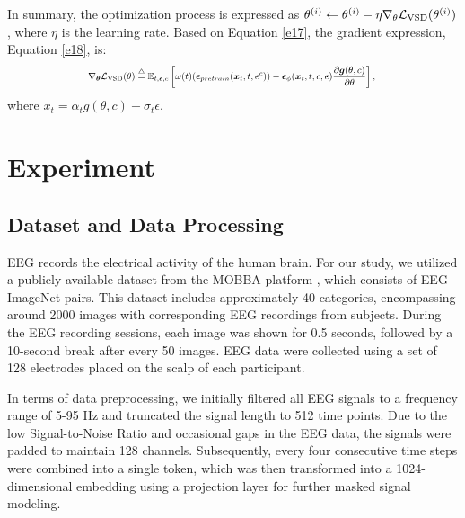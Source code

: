 \documentclass[conference]{IEEEtran}
\begin{document}
In summary, the optimization process is expressed as $ \theta^{(i)} \leftarrow \theta^{(i)} - \eta \nabla_{\theta}\mathcal{L}_{\textup{VSD}}(\theta^{(i)}) $, where $ \eta $ is the learning rate. Based on Equation \ref{e17}, the gradient expression, Equation \ref{e18}, is:
\begin{equation}\label{e18}
\scalebox{0.75}{$
\begin{aligned}
 {\nabla_{\bm{\theta}}}\mathcal{L}_{\textup{VSD}}(\theta) \overset{\triangle}{=}\mathbb{E}_{t,\bm\epsilon,c}\left[ \omega(t)({\bm\epsilon}_{pretrain}(\bm{x}_t,t,e^c))-{\bm\epsilon}_{\phi}(\bm{x}_t,t,c,e)\frac{\partial \bm{g}(\theta,c)}{\partial \theta}\right],
    \end{aligned}$
}
\end{equation}
where $x_t=\alpha_tg(\theta,c)+\sigma_t\epsilon$.



    

\section{Experiment}



\subsection{Dataset and Data Processing}
EEG records the electrical activity of the human brain. For our study, we utilized a publicly available dataset from the MOBBA platform \cite{b15}, which consists of EEG-ImageNet pairs. This dataset includes approximately 40 categories, encompassing around 2000 images with corresponding EEG recordings from subjects. During the EEG recording sessions, each image was shown for 0.5 seconds, followed by a 10-second break after every 50 images. EEG data were collected using a set of 128 electrodes placed on the scalp of each participant.

In terms of data preprocessing, we initially filtered all EEG signals to a frequency range of 5-95 Hz and truncated the signal length to 512 time points. Due to the low Signal-to-Noise Ratio and occasional gaps in the EEG data, the signals were padded to maintain 128 channels. Subsequently, every four consecutive time steps were combined into a single token, which was then transformed into a 1024-dimensional embedding using a projection layer for further masked signal modeling.
\end{document}
